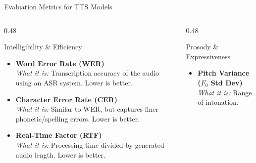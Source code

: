 \documentclass{beamer}
\begin{document}
\begin{frame}{Evaluation Metrics for TTS Models}
    \vspace{0.1cm}
    
    \begin{columns}[T]
        
        \begin{column}{0.48\textwidth}
            \begin{block}{Intelligibility \& Efficiency}
                \begin{itemize}\small
                    \setlength\itemsep{0.5em}
                    \item \textbf{Word Error Rate (WER)} \\
                          \textit{What it is:} Transcription accuracy of the audio using an ASR system. Lower is better. \\
                          
                    \item \textbf{Character Error Rate (CER)} \\
                          \textit{What it is:} Similar to WER, but captures finer phonetic/spelling errors. Lower is better.\\
                          
                    \item \textbf{Real-Time Factor (RTF)} \\
                          \textit{What it is:} Processing time divided by generated audio length. Lower is better. \\
                \end{itemize}
            \end{block}
        \end{column}

        \begin{column}{0.48\textwidth}
            \begin{block}{Prosody \& Expressiveness}
                \begin{itemize}\small
                    \setlength\itemsep{0.3em}
                    \item \textbf{Pitch Variance ($F_0$ Std Dev)} \\
                          \textit{What it is:} Range of intonation. \\
                          

\end{itemize}
\end{block}
\end{column}
\end{columns}
\end{frame}
\end{document}
